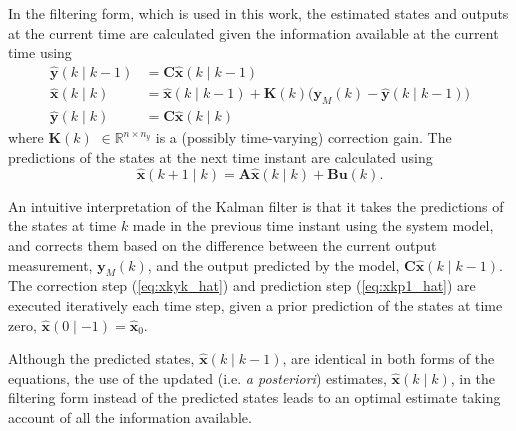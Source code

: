 In the filtering form, which is used in this work, the estimated states and outputs at the current time are calculated given the information available at the current time using
\begin{equation} \label{eq:xkyk_hat}
	\begin{aligned}
		\mathbf{\hat{y}}(k \mid k-1) &= \mathbf{C} \mathbf{\hat{x}}(k \mid k-1) \\
		\mathbf{\hat{x}}(k \mid k) &= \mathbf{\hat{x}}(k \mid k-1) + \mathbf{K}(k) \big( \mathbf{y}_M(k) - \mathbf{\hat{y}}(k \mid k-1)  \big) \\
		\mathbf{\hat{y}}(k \mid k) &= \mathbf{C} \mathbf{\hat{x}}(k \mid k)
	\end{aligned}
\end{equation}
%
%
where $\mathbf{K}(k)$ $\in \mathbb{R}^{n \times n_y}$ is a (possibly time-varying) correction gain. The predictions of the states at the next time instant are calculated using
%
%
%
\begin{equation} \label{eq:xkp1_hat}
	\mathbf{\hat{x}}(k+1 \mid k) = \mathbf{A} \mathbf{\hat{x}}(k \mid k) + \mathbf{B} \mathbf{u}(k).
\end{equation}

An intuitive interpretation of the Kalman filter is that it takes the predictions of the states at time $k$ made in the previous time instant using the system model, and corrects them based on the difference between the current output measurement, $\mathbf{y}_M(k)$, and the output predicted by the model, $\mathbf{C} \mathbf{\hat{x}}(k \mid k-1)$. The correction step (\ref{eq:xkyk_hat}) and prediction step (\ref{eq:xkp1_hat}) are executed iteratively each time step, given a prior prediction of the states at time zero, $\mathbf{\hat{x}}(0 \mid -1)=\mathbf{\hat{x}}_0$.

Although the predicted states, $\hat{\mathbf{x}}(k \mid k-1)$, are identical in both forms of the equations, the use of the updated (i.e. \textit{a posteriori}) estimates, $\hat{\mathbf{x}}(k \mid k)$, in the filtering form instead of the predicted states leads to an optimal estimate taking account of all the information available.

